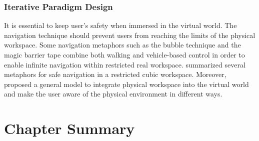 \subsubsection{Iterative Paradigm Design}
It is essential to keep user's safety when immersed in the virtual world. The navigation technique should prevent users from reaching the limits of the physical workspace. Some navigation metaphors such as the bubble technique \citep{Dominjon2005Bubble} and the magic barrier tape \citep{Cirio2009MBT} combine both walking and vehicle-based control in order to enable infinite navigation within restricted real workspace. \citet{Cirio2012Cube} summarized several metaphors for safe navigation in a restricted cubic workspace. Moreover, \citet{Fleury2010Generic} proposed a general model to integrate physical workspace into the virtual world and make the user aware of the physical environment in different ways.

\section{Chapter Summary}

